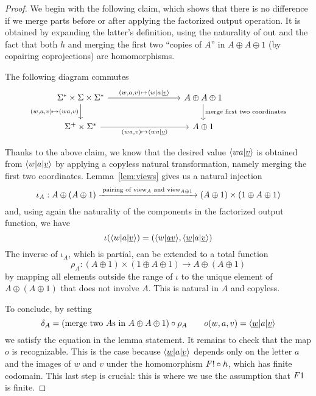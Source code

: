\begin{proof}
    We begin with the following claim, which shows that there is no difference if we merge parts before or after applying the factorized output operation. It is obtained by expanding the latter's definition, using the naturality of $\mathrm{out}$ and the fact that  both $h$ and merging the first two \enquote{copies of $A$} in $A \oplus A \oplus 1$ (by copairing coprojections) are homomorphisms.
    \begin{claim}\label{claim:merge-factorized-output}
        The following diagram commutes 
        \[
        \begin{tikzcd}
            [column sep=3cm]
        \Sigma^* \times \Sigma \times \Sigma^* 
        \ar[r,"{(w,a,v) \mapsto \tuple{w|a|\underline v}}"]
        \ar[d,"{(w,a,v) \mapsto (wa,v)}"']
        &
        A \oplus A \oplus 1
        \ar[d,"\text{merge first two coordinates}"]
        \\
        \Sigma^+ \times \Sigma^* 
        \ar[r,"{(wa,v) \mapsto \tuple{wa|\underline v}}"']
        &
        A  \oplus 1
        \end{tikzcd}
        \]
    \end{claim}

    Thanks to the above claim, we know that  the desired value $\langle wa|\underline v \rangle$ is obtained from  $\langle w|a| \underline v \rangle$
    by applying a copyless natural transformation, namely merging the first two coordinates. 
     Lemma~\ref{lem:views} gives us a natural injection
    \[ \iota_A : A \oplus (A \oplus 1) \xrightarrow{\;\text{pairing of $\mathrm{view}_A$ and $\mathrm{view}_{A \oplus 1}$}\;} (A \oplus 1) \times (1 \oplus A \oplus 1) \]
    and, using again the naturality of the components in the factorized output function, we have
    \[ \iota(\langle w|a| \underline v \rangle) = (\langle w|\underline{av} \rangle,\langle \underline w| a| \underline v \rangle) \]
    The inverse of $\iota_A$, which is partial, can be extended to a total function
    \[ \rho_A : (A \oplus 1) \times (1 \oplus A \oplus 1) \to A \oplus (A \oplus 1) \]
    by mapping all elements outside the range of $\iota$ to the unique element of $A \oplus (A \oplus 1)$ that does not involve $A$. This is natural in $A$ and copyless.
    
    To conclude, by setting
    \[ \delta_A = (\text{merge two $A$s in $A \oplus A \oplus 1$}) \circ \rho_A \qquad o(w,a,v) = \langle \underline w| a| \underline v \rangle \]
    we satisfy the equation in the lemma statement. It remains to check that the map $o$ is recognizable. This is the case because $\langle \underline w| a| \underline v \rangle$ depends only on the letter $a$ and the images of $w$ and $v$ under the homomorphism $\functor ! \circ h$, which has finite codomain. This last step is crucial: this is where we use the assumption that $\functor 1$ is finite.
\end{proof}


